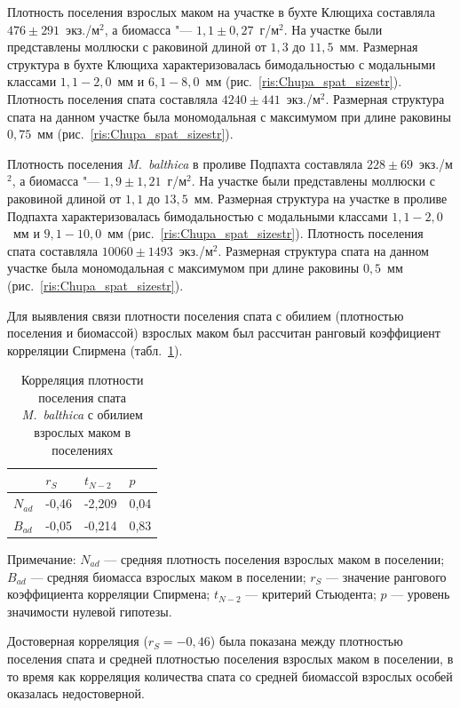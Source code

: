 Плотность поселения взрослых маком на участке в бухте Клющиха составляла $476 \pm 291$~экз./м$^2$, а биомасса "--- $1,1 \pm 0,27$~г/м$^2$. 
На участке были представлены моллюски с раковиной длиной от $1,3$ до $11,5$~мм. 
Размерная структура в бухте Клющиха характеризовалась бимодальностью с модальными классами $1,1 - 2,0$~мм и $6,1 - 8,0$~мм (рис.~\ref{ris:Chupa_spat_sizestr}). 
Плотность поселения спата составляла $4240 \pm 441$~экз./м$^2$. 
Размерная структура спата на данном участке была мономодальная с максимумом при длине раковины $0,75$~мм (рис.~\ref{ris:Chupa_spat_sizestr}).

Плотность поселения {\it M.~balthica} в проливе Подпахта составляла $228 \pm 69$~экз./м$^2$, а биомасса "--- $1,9 \pm 1,21$~г/м$^2$. 
На участке были представлены моллюски с раковиной длиной от $1,1$ до $13,5$~мм. 
Размерная структура на участке в проливе Подпахта характеризовалась бимодальностью с модальными классами $1,1 - 2,0$~мм и $9,1 - 10,0$~мм (рис.~\ref{ris:Chupa_spat_sizestr}). 
Плотность поселения спата составляла $10060 \pm 1493$~экз./м$^2$. 
Размерная структура спата на данном участке была мономодальная с максимумом при длине раковины $0,5$~мм (рис.~\ref{ris:Chupa_spat_sizestr}).

Для выявления связи плотности поселения спата с обилием (плотностью поселения и биомассой) взрослых маком был рассчитан ранговый коэффициент корреляции Спирмена (табл.~\ref{spat_abult_correlation}). 
\begin{table}[p]
\caption{Корреляция плотности поселения спата \textit{M.~balthica} с  обилием взрослых маком в поселениях}
\label{spat_abult_correlation}
\begin{center}
\begin{tabular}{|l|lll|}
\hline
     & $r_S$    & $t_{N-2}$   & $p$    \\ \hline
$N_{ad}$ & -0,46 & -2,209 & 0,04 \\
$B_{ad}$ & -0,05 & -0,214 & 0,83\\ \hline
\end{tabular}
\end{center}

\footnotesize{Примечание: $N_{ad}$ --- средняя плотность поселения взрослых маком в поселении; 
$B_{ad}$ --- средняя биомасса взрослых маком в поселении; 
$r_S$ --- значение рангового коэффициента корреляции Спирмена; 
$t_{N-2}$ --- критерий Стьюдента;   
$p$ --- уровень значимости нулевой гипотезы.}
\end{table}
До\-сто\-вер\-ная корреляция ($r_S = -0,46$) была показана между плотностью поселения спата и средней плотностью поселения взрослых маком в поселении, в то время как корреляция количества спата со средней биомассой взрослых особей оказалась недостоверной.

